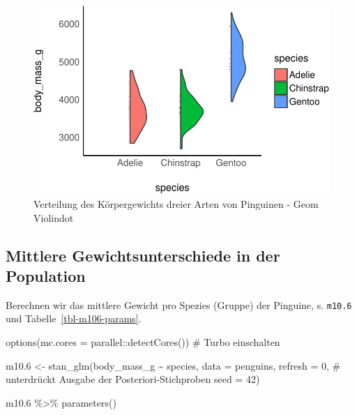 \documentclass[
  a4paper,
  DIV=11]{scrreprt}
\newenvironment{Shaded}{\begin{snugshade}}{\end{snugshade}}
\newcommand{\AttributeTok}[1]{\textcolor[rgb]{0.40,0.45,0.13}{#1}}
\newcommand{\CommentTok}[1]{\textcolor[rgb]{0.37,0.37,0.37}{#1}}
\newcommand{\DecValTok}[1]{\textcolor[rgb]{0.68,0.00,0.00}{#1}}
\newcommand{\FloatTok}[1]{\textcolor[rgb]{0.68,0.00,0.00}{#1}}
\newcommand{\FunctionTok}[1]{\textcolor[rgb]{0.28,0.35,0.67}{#1}}
\newcommand{\NormalTok}[1]{\textcolor[rgb]{0.00,0.23,0.31}{#1}}
\newcommand{\OtherTok}[1]{\textcolor[rgb]{0.00,0.23,0.31}{#1}}
\newcommand{\SpecialCharTok}[1]{\textcolor[rgb]{0.37,0.37,0.37}{#1}}
\theoremstyle{definition}
\theoremstyle{remark}
\begin{document}
\begin{figure}[H]

{\centering \includegraphics{./metrische-AV_files/figure-pdf/fig-penguines3-1.pdf}

}

\caption{\label{fig-penguines3}Verteilung des Körpergewichts dreier
Arten von Pinguinen - Geom Violindot}

\end{figure}

\hypertarget{mittlere-gewichtsunterschiede-in-der-population}{%
\subsection{Mittlere Gewichtsunterschiede in der
Population}\label{mittlere-gewichtsunterschiede-in-der-population}}

Berechnen wir das mittlere Gewicht pro Spezies (Gruppe) der Pinguine, s.
\texttt{m10.6} und Tabelle~\ref{tbl-m106-params}.

\begin{Shaded}
\begin{Highlighting}[]
\FunctionTok{options}\NormalTok{(}\AttributeTok{mc.cores =}\NormalTok{ parallel}\SpecialCharTok{::}\FunctionTok{detectCores}\NormalTok{())  }\CommentTok{\# Turbo einschalten}

\NormalTok{m10}\FloatTok{.6} \OtherTok{\textless{}{-}} \FunctionTok{stan\_glm}\NormalTok{(body\_mass\_g }\SpecialCharTok{\textasciitilde{}}\NormalTok{ species, }
                  \AttributeTok{data =}\NormalTok{ penguins, }
                  \AttributeTok{refresh =} \DecValTok{0}\NormalTok{,  }\CommentTok{\# unterdrückt Ausgabe der Posteriori{-}Stichproben}
                  \AttributeTok{seed =} \DecValTok{42}\NormalTok{)}


\NormalTok{m10}\FloatTok{.6} \SpecialCharTok{\%\textgreater{}\%} 
  \FunctionTok{parameters}\NormalTok{()}
\end{Highlighting}
\end{Shaded}
\end{document}

